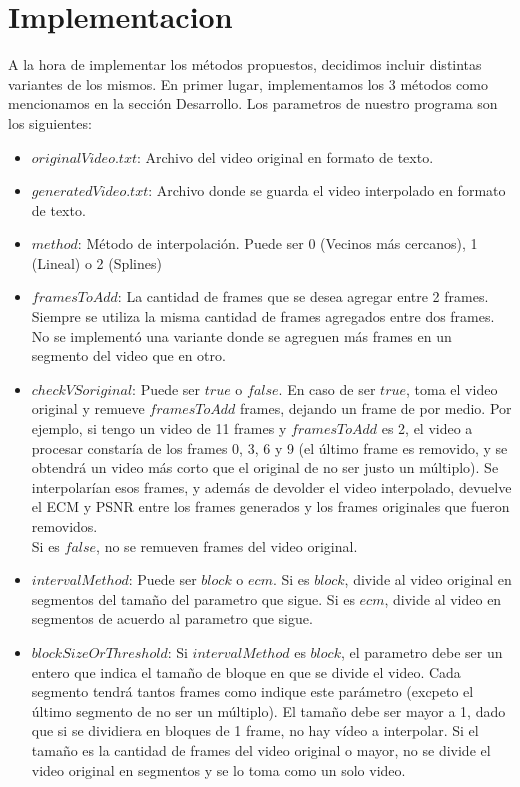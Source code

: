 \section{Implementacion}

A la hora de implementar los métodos propuestos, decidimos incluir distintas variantes de los mismos. En primer lugar, implementamos los 3 métodos como mencionamos en la sección Desarrollo. Los parametros de nuestro programa son los siguientes: \\

\begin{itemize}
  \item $originalVideo.txt $: Archivo del video original en formato de texto.
  \item $generatedVideo.txt$: Archivo donde se guarda el video interpolado en formato de texto.
  \item $method$: Método de interpolación. Puede ser 0 (Vecinos más cercanos), 1 (Lineal) o 2 (Splines)
  \item $framesToAdd$: La cantidad de frames que se desea agregar entre 2 frames. Siempre se utiliza la misma cantidad de frames agregados entre dos frames. No se implementó una variante donde se agreguen más frames en un segmento del video que en otro.
  \item $checkVSoriginal$: Puede ser $true$ o $false$. En caso de ser $true$, toma el video original y remueve $framesToAdd$ frames, dejando un frame de por medio. Por ejemplo, si tengo un video de 11 frames y $framesToAdd$ es 2, el video a procesar constaría de los frames 0, 3, 6 y 9 (el último frame es removido, y se obtendrá un video más corto que el original de no ser justo un múltiplo). Se interpolarían esos frames, y además de devolder el video interpolado, devuelve el ECM y PSNR entre los frames generados y los frames originales que fueron removidos.\\
  Si es $false$, no se remueven frames del video original.
  \item $intervalMethod$: Puede ser $block$ o $ecm$. Si es $block$, divide al video original en segmentos del tamaño del parametro que sigue. Si es $ecm$, divide al video en segmentos de acuerdo al parametro que sigue.
  \item $blockSizeOrThreshold$: Si $intervalMethod$ es $block$, el parametro debe ser un entero que indica el tamaño de bloque en que se divide el video. Cada segmento tendrá tantos frames como indique este parámetro (excpeto el último segmento de no ser un múltiplo). El tamaño debe ser mayor a 1, dado que si se dividiera en bloques de 1 frame, no hay vídeo a interpolar. Si el tamaño es la cantidad de frames del video original o mayor, no se divide el video original en segmentos y se lo toma como un solo video. \\

\end{itemize}
